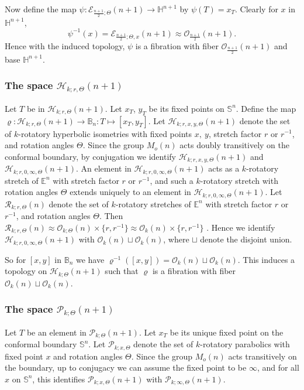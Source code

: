 \documentclass[11pt]{amsart}
\theoremstyle{definition}
\theoremstyle{remark}
\numberwithin{equation}{section}
\theoremstyle{plain}
\begin{document}
 Now define the map \hbox{$\psi: {\mathcal E}_{\frac{n+1}{2}; \Theta}(n+1) \to {\mathbb H}^{n+1}$} by $\psi(T)=x_T$. Clearly for $x$ in ${\mathbb H}^{n+1}$, 
$$\psi^{-1}(x)= {\mathcal E}_{\frac{n+1}{2}; \Theta, x}(n+1) \approx {\mathcal O}_{\frac{n+1}{2}}(n+1).$$ 
Hence with the induced topology, $\psi$ is a fibration with fiber ${\mathcal O}_{\frac{n+1}{2}}(n+1)$ and base ${\mathbb H}^{n+1}$. 

\subsubsection*{The space ${\mathcal H}_{k; r, \Theta}(n+1)$} Let $T$ be in ${\mathcal H}_{k;  r,  \Theta}(n+1)$.  Let $x_T$, $y_T$ be its fixed points on ${\mathbb S}^n$. Define the map $\varrho: {\mathcal H}_{k; r, \Theta}(n+1) \to {\mathbb B}_n: T \mapsto [x_T, y_T]$. Let ${\mathcal H}_{k; r,  x, y, \Theta}(n+1)$ denote the set of $k$-rotatory hyperbolic isometries with fixed points $x, \ y$, stretch factor $r$ or $r^{-1}$, and rotation angles $\Theta$.  
Since the group $M_o(n)$ acts doubly transitively on the conformal boundary, by conjugation we identify  
${\mathcal H}_{k;  r,  x, y, \Theta}(n+1)$ and ${\mathcal H}_{k;  r,  0, \infty, \Theta}(n+1)$. An element in ${\mathcal H}_{k; r,  0, \infty, \Theta}(n+1)$ acts as a $k$-rotatory stretch of ${\mathbb E}^n$ with stretch factor $r$ or $r^{-1}$, and such a $k$-rotatory stretch with rotation angles $\Theta$ extends uniquely to an element in  ${\mathcal H}_{k;  r, 0, \infty, \Theta}(n+1)$.  Let ${\mathcal R}_{k; r, \Theta}(n)$ denote the set of $k$-rotatory stretches of ${\mathbb E}^n$ with stretch factor $r$ or $r^{-1}$, and  rotation angles $\Theta$. Then ${\mathcal R}_{k; r, \Theta}(n) \approx {\mathcal O}_{k; \Theta}(n) \times \{r, r^{-1}\} \approx {\mathcal O}_{k}(n)\times \{r , r^{-1} \}$ . Hence we identify ${\mathcal H}_{k;  r, 0, \infty, \Theta}(n+1)$ with ${\mathcal O}_{k}(n) \sqcup {\mathcal O}_k(n)$, where $\sqcup$ denote the disjoint union.  

So for $[x,y]$ in ${\mathbb B}_n$ we have $\varrho^{-1}([x,y])={\mathcal O}_{k}(n)\sqcup {\mathcal O}_k(n)$. This induces a topology on ${\mathcal H}_{k;   \Theta}(n+1)$ such that  $\varrho$ is a fibration with fiber ${\mathcal O}_{k}(n) \sqcup {\mathcal O}_k(n)$. 

\subsubsection*{The space ${\mathcal P}_{k; \Theta}(n+1)$} Let $T$ be an element in ${\mathcal P}_{k;  \Theta}(n+1)$. Let $x_T$ be its unique fixed point on the conformal boundary ${\mathbb S}^n$. 
Let ${\mathcal P}_{k;  x, \Theta}$ denote the set of $k$-rotatory parabolics with fixed point $x$ and rotation angles $\Theta$. Since the group $M_o(n)$ acts transitively on the boundary, up to conjugacy we can assume the fixed point to be $\infty$, and for all $x$ on ${\mathbb S}^n$,  this identifies ${\mathcal P}_{k;  x, \Theta}(n+1)$ with ${\mathcal P}_{k;  \infty, \Theta}(n+1)$. 
\end{document}
